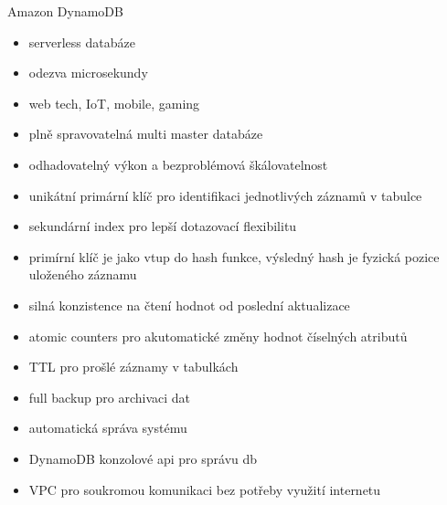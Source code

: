 \documentclass{article}
\begin{document}
 	 	 
	\begin{subsubsection}{Amazon DynamoDB}
		\begin{itemize}
			\item serverless databáze
			\item odezva microsekundy
			\item web tech, IoT, mobile, gaming
			\item plně spravovatelná multi master databáze
			\item odhadovatelný výkon a bezproblémová škálovatelnost
			\item unikátní primární klíč pro identifikaci jednotlivých záznamů v tabulce
			\item sekundární index pro lepší dotazovací flexibilitu
			\item primírní klíč je jako vtup do hash funkce, výsledný hash je fyzická pozice uloženého záznamu
			\item silná konzistence na čtení hodnot od poslední aktualizace
			\item atomic counters pro akutomatické změny hodnot číselných atributů
			\item TTL pro prošlé záznamy v tabulkách
			\item full backup pro archivaci dat
			\item automatická správa systému
			\item DynamoDB konzolové api pro správu db
			\item VPC pro soukromou komunikaci bez potřeby využití internetu
		\end{itemize}
	\end{subsubsection}
\end{document}
